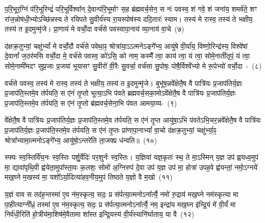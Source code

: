 {\anuvakamend[{अप॑श्यन्तो\-ऽग्नीषो॒मीय॑मा॒त्मना॒ परा॒ त्रीणि॑ च}]}

प॒रि॒भूर॒ग्निं प॑रि॒भूरिन्द्रं॑ परि॒भूर्विश्वा᳚न् दे॒वान्प॑रि॒भूर्माꣳ स॒ह ब्र॑ह्मवर्च॒सेन॒ स नः॑ पवस्व॒ शं गवे॒ शं जना॑य॒ शमर्व॑ते॒ शꣳ रा॑ज॒न्नोष॑धी॒भ्यो\-ऽच्छि॑न्नस्य ते रयिपते सु॒वीर्य॑स्य रा॒यस्पोष॑स्य ददि॒तारः॑ स्याम। तस्य॑ मे रास्व॒ तस्य॑ ते भक्षीय॒ तस्य॑ त इ॒दमुन्मृ॑जे। प्रा॒णाय॑ मे वर्चो॒दा वर्च॑से पवस्वापा॒नाय॑ व्या॒नाय॑ वा॒चे~(७)\ip

द॑क्षक्र॒तुभ्यां॒ चक्षु॑र्भ्यां मे वर्चो॒दौ वर्च॑से पवेथा॒ꣴ॒ श्रोत्रा॑या॒\-ऽऽ\-\-त्मने\-ऽङ्गे᳚भ्य॒ आयु॑षे वी॒र्या॑य॒ विष्णो॒रिन्द्र॑स्य॒ विश्वे॑षां दे॒वानां᳚ ज॒ठर॑मसि वर्चो॒दा मे॒ वर्च॑से पवस्व॒ को॑\-ऽसि॒ को नाम॒ कस्मै᳚ त्वा॒ काय॑ त्वा॒ यं त्वा॒ सोमे॒नाती॑तृपं॒ यं त्वा॒ सोमे॒नामी॑मदꣳ सुप्र॒जाः प्र॒जया॑ भूयासꣳ सु॒वीरो॑ वी॒रैः सु॒वर्चा॒ वर्च॑सा सु॒पोषः॒ पोषै॒र्विश्वे᳚भ्यो मे रू॒पेभ्यो॑ वर्चो॒दा~-~(८)\ip

वर्च॑से पवस्व॒ तस्य॑ मे रास्व॒ तस्य॑ ते भक्षीय॒ तस्य॑ त इ॒दमुन्मृ॑जे। बुभू॑ष॒न्नवे᳚क्षेतै॒ष वै पात्रि॑यः प्र॒जा\-प॑तिर्य॒ज्ञः प्र॒जा\-प॑ति॒स्तमे॒व त॑र्पयति॒ स ए॑नं तृ॒प्तो भूत्या॒\-ऽभि प॑वते ब्रह्मवर्च॒सका॒मो\-ऽवे᳚क्षेतै॒ष वै पात्रि॑यः प्र॒जा\-प॑तिर्य॒ज्ञः प्र॒जा\-प॑ति॒स्तमे॒व त॑र्पयति॒ स ए॑नं तृ॒प्तो ब्र॑ह्मवर्च॒सेना॒भि प॑वत आमया॒व्य-~(९)\ip

वे᳚क्षेतै॒ष वै पात्रि॑यः प्र॒जा\-प॑तिर्य॒ज्ञः प्र॒जा\-प॑ति॒स्तमे॒व त॑र्पयति॒ स ए॑नं तृ॒प्त आयु॑षा॒\-ऽभि प॑वते\-ऽभि॒चर॒न्नवे᳚क्षेतै॒ष वै पात्रि॑यः प्र॒जा\-प॑तिर्य॒ज्ञः प्र॒जा\-प॑ति॒स्तमे॒व त॑र्पयति॒ स ए॑नं तृ॒प्तः प्रा॑णापा॒ना\-भ्यां᳚ वा॒चो द॑क्षक्र॒तुभ्यां॒ चक्षु॑र्भ्या॒ꣴ॒ श्रोत्रा᳚भ्यामा॒त्मनो\-ऽङ्गे᳚भ्य॒ आयु॑षो॒\-ऽन्तरे॑ति ता॒जक्प्र ध॑न्वति॥~(१०)\ip

{\anuvakamend[{वा॒चे रू॒पेभ्यो॑ वर्चो॒दा आ॑मया॒वी पञ्च॑चत्वारिꣳशच्च}]}

स्फ्यः स्व॒स्तिर्वि॑घ॒नः स्व॒स्तिः पर्\mbox{}शु॒र्वेदिः॑ पर॒शुर्नः॑ स्व॒स्तिः। य॒ज्ञिया॑ यज्ञ॒कृतः॑ स्थ॒ ते मा॒\-ऽस्मिन् य॒ज्ञ उप॑ ह्वयध्व॒मुप॑ मा॒ द्यावा॑\-पृथि॒वी ह्व॑येता॒मुपा᳚स्ता॒वः क॒लशः॒ सोमो॑ अ॒ग्निरुप॑ दे॒वा उप॑ य॒ज्ञ उप॑ मा॒ होत्रा॑ उपह॒वे ह्व॑यन्तां॒ नमो॒\-ऽग्नये॑ मख॒घ्ने म॒खस्य॑ मा॒ यशो᳚\-ऽर्या॒दित्या॑हव॒नीय॒मुप॑ तिष्ठते य॒ज्ञो वै म॒खो~(११)\ip

य॒ज्ञं वाव स तद॑ह॒न्तस्मा॑ ए॒व न॑म॒स्कृत्य॒ सदः॒ प्र स॑र्पत्या॒त्मनो\-ऽना᳚र्त्यै॒ नमो॑ रु॒द्राय॑ मख॒घ्ने नम॑स्कृत्या मा पा॒हीत्याग्नी᳚ध्रं॒ तस्मा॑ ए॒व न॑म॒स्कृत्य॒ सदः॒ प्र स॑र्पत्या॒त्मनो\-ऽना᳚र्त्यै॒ नम॒ इन्द्रा॑य मख॒घ्न इ॑न्द्रि॒यं मे॑ वी॒र्यं॑ मा निर्व॑धी॒रिति॑ हो॒त्रीय॑मा॒शिष॑मे॒वैतामा शा᳚स्त इन्द्रि॒यस्य॑ वी॒र्य॑स्यानि॑र्घाताय॒ या वै~(१२)\ip

